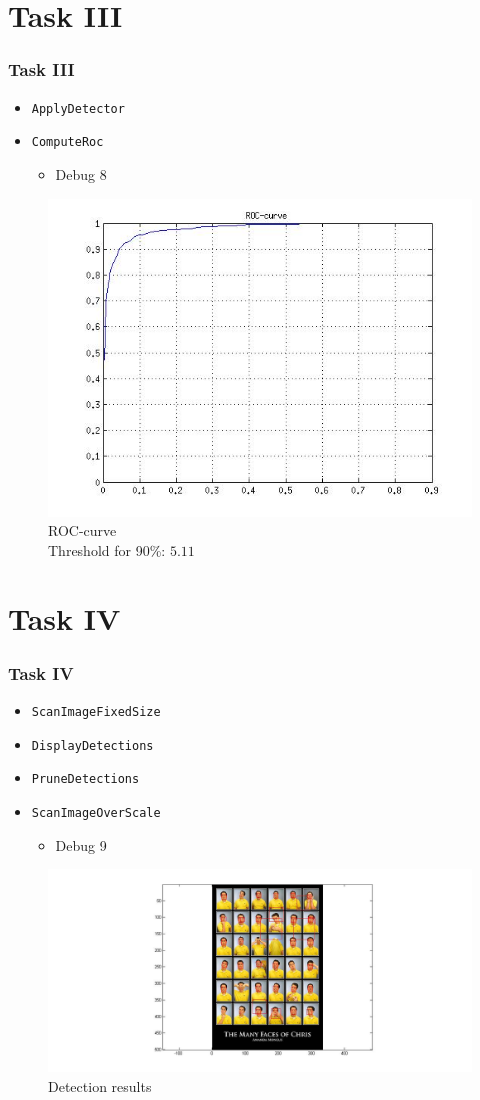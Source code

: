 \documentclass{beamer}
\newenvironment{debug}{
        \begin{itemize}
    }{\end{itemize}}
\newcommand{\debugpoint}[1]{\begin{debug} \item[] \dotfill \hspace{0.5cm} Debug #1 \end{debug}}
\begin{document}
\section{Task III}

\begin{frame}
\frametitle{Task III}
\begin{itemize}
    \item \texttt{ApplyDetector}
    \item \texttt{ComputeRoc}
        \debugpoint{8}
\end{itemize}
\begin{figure}
    \centering
    \includegraphics[width=0.4\linewidth]{PicturesResults/task3ROC.jpg}
    \caption{ROC-curve \\
    Threshold for 90\%: $5.11$}

\end{figure}

\end{frame}

\section{Task IV}

\begin{frame}
\frametitle{Task IV}
\begin{itemize}
    \item \texttt{ScanImageFixedSize}
    \item \texttt{DisplayDetections}
    \item \texttt{PruneDetections}
    \item \texttt{ScanImageOverScale}
        \debugpoint{9}
\end{itemize}
\end{frame}

\begin{frame}
\begin{figure}
    \centering
    \includegraphics[height=0.5\linewidth]{PicturesResults/task4dets.jpg}
    \caption{Detection results}
\end{figure}
\end{frame}
\end{document}
